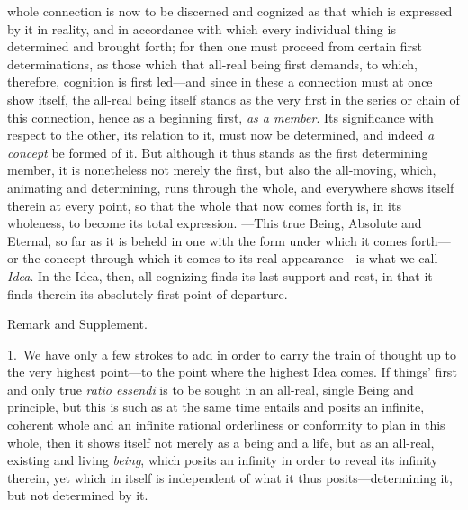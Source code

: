\documentclass[12pt,a4paper]{book}
\begin{document}
whole connection is now to be discerned and cognized as that which is expressed by it
in reality, and in accordance with which every individual thing is determined and
brought forth; for then one must proceed from certain first determinations, as those
which that all-real being first demands, to which, therefore, cognition is first
led---and since in these a connection must at once show itself, the all-real being
itself stands as the very first in the series or chain of this connection, hence as a
beginning first, \emph{as a member}. Its significance with respect to the other, its
relation to it, must now be determined, and indeed \emph{a concept} be formed of it.
But although it thus stands as the first determining member, it is nonetheless not
merely the first, but also the all-moving, which, animating and determining, runs
through the whole, and everywhere shows itself therein at every point, so that the
whole that now comes forth is, in its wholeness, to become its total expression.
---This true Being, Absolute and Eternal, so far as it is beheld in one with the form
under which it comes forth---or the concept through which it comes to its real
appearance---is what we call \emph{Idea}. In the Idea, then, all cognizing finds its
last support and rest, in that it finds therein its absolutely first point of
departure.

\begin{center}Remark and Supplement.\end{center}
1.~We have only a few strokes to add in order to carry the train of thought up to
the very highest point---to the point where the highest Idea comes. If things'
first and only true \textit{ratio essendi} is to be sought in an all-real, single
Being and principle, but this is such as at the same time entails and posits an
infinite, coherent whole and an infinite rational orderliness or conformity to
plan in this whole, then it shows itself not merely as a being and a life, but as
an all-real, existing and living \emph{being}, which posits an infinity in order to reveal
its infinity therein, yet which in itself is independent of what it thus
posits---determining it, but not determined by it.
\end{document}

